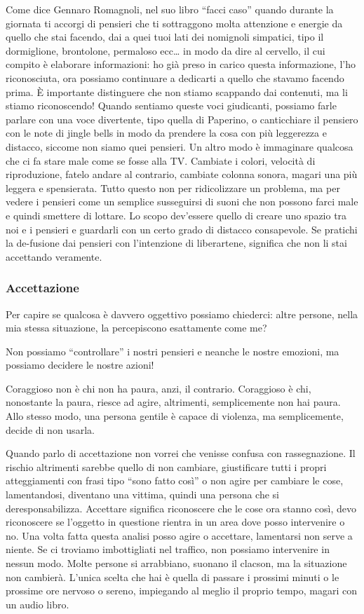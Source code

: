\documentclass[12pt]{book} %
\begin{document}
Come dice Gennaro Romagnoli, nel suo libro “facci caso” quando durante la giornata ti accorgi di pensieri che ti sottraggono
molta attenzione e energie da quello che stai facendo, dai a quei tuoi lati dei nomignoli simpatici, tipo il
dormiglione, brontolone, permaloso ecc… in modo da dire al
cervello, il cui compito è elaborare informazioni: ho già preso in carico questa informazione, l'ho riconosciuta, ora
possiamo continuare a dedicarti a quello che stavamo facendo prima. È importante distinguere che non stiamo scappando
dai contenuti, ma li stiamo riconoscendo! Quando sentiamo queste voci giudicanti, possiamo farle parlare con una voce
divertente, tipo quella di Paperino, o canticchiare il pensiero con le note di jingle bells in modo da prendere la cosa
con più leggerezza e distacco, siccome non siamo quei pensieri. Un altro modo è immaginare qualcosa che ci fa stare
male come se fosse alla TV. Cambiate i colori, velocità di riproduzione, fatelo andare al contrario, cambiate colonna
sonora, magari una più leggera e spensierata. Tutto questo non per ridicolizzare un problema, ma per vedere i pensieri
come un semplice susseguirsi di suoni che non possono farci male e quindi smettere di lottare. Lo scopo
dev'essere quello di creare uno spazio tra noi e i pensieri e guardarli con un certo grado di
distacco consapevole. Se pratichi la de-fusione dai pensieri con l'intenzione di liberartene,
significa che non li stai accettando veramente.

\subsubsection{Accettazione}
Per capire se qualcosa è davvero oggettivo possiamo chiederci: altre persone, nella mia stessa situazione, la
percepiscono esattamente come me?

Non possiamo “controllare” i nostri pensieri e neanche le nostre emozioni, ma possiamo decidere le nostre azioni!

Coraggioso non è chi non ha paura, anzi, il contrario. Coraggioso è chi, nonostante la paura, riesce ad agire, altrimenti, semplicemente non hai paura.
Allo stesso modo, una persona gentile è capace di violenza, ma semplicemente, decide di non usarla.

Quando parlo di accettazione non vorrei che venisse confusa con rassegnazione. Il rischio altrimenti sarebbe quello di
non cambiare, giustificare tutti i propri atteggiamenti con frasi tipo “sono fatto così” o non agire per cambiare le
cose, lamentandosi, diventano una vittima, quindi una persona che si deresponsabilizza. Accettare significa riconoscere
che le cose ora stanno così, devo riconoscere se l'oggetto in questione rientra in un area dove
posso intervenire o no. Una volta fatta questa analisi posso agire o accettare, lamentarsi non serve a niente. Se ci
troviamo imbottigliati nel traffico, non possiamo intervenire in nessun modo. Molte persone si arrabbiano, suonano il
clacson, ma la situazione non cambierà. L'unica scelta che hai è quella di passare i prossimi
minuti o le prossime ore nervoso o sereno, impiegando al meglio il proprio tempo, magari con un audio libro. 
\end{document}
